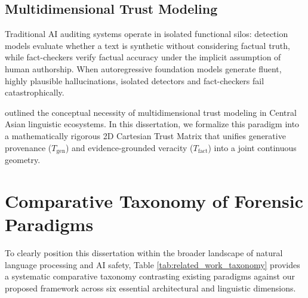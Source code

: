 \subsection{Multidimensional Trust Modeling}
Traditional AI auditing systems operate in isolated functional silos: detection models evaluate whether a text is synthetic without considering factual truth, while fact-checkers verify factual accuracy under the implicit assumption of human authorship. When autoregressive foundation models generate fluent, highly plausible hallucinations, isolated detectors and fact-checkers fail catastrophically. 

\citet{guo2026kazakh} outlined the conceptual necessity of multidimensional trust modeling in Central Asian linguistic ecosystems. In this dissertation, we formalize this paradigm into a mathematically rigorous 2D Cartesian Trust Matrix that unifies generative provenance ($T_{\text{gen}}$) and evidence-grounded veracity ($T_{\text{fact}}$) into a joint continuous geometry.

\section{Comparative Taxonomy of Forensic Paradigms}
\label{sec:rel_taxonomy}

To clearly position this dissertation within the broader landscape of natural language processing and AI safety, Table \ref{tab:related_work_taxonomy} provides a systematic comparative taxonomy contrasting existing paradigms against our proposed framework across six essential architectural and linguistic dimensions.

